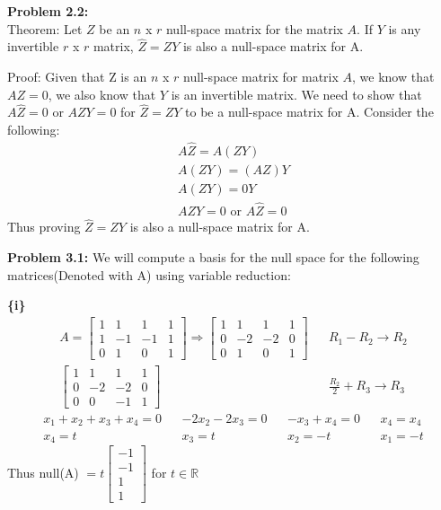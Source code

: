 \documentclass{article}
\begin{document}
 
\pagestyle{fancy}

\textbf{Problem 2.2:} \\
Theorem: Let $Z$ be an $n$ x $r$ null-space matrix for the matrix $A$. If $Y$ is any invertible $r$ x $r$ matrix,  $\hat{Z} = ZY$ is also a null-space matrix for A.

Proof: Given that Z is an $n$ x $r$ null-space matrix for matrix $A$, we know that $AZ = 0$, we also know that $Y$ is an invertible matrix. We need to show that $A\hat{Z} = 0$ or $AZY = 0$ for $\hat{Z} = ZY$ to be a null-space matrix for A. Consider the following:
\begin{align*}
    A \hat{Z} = A(ZY) \\
    A(ZY) = (AZ)Y \\
    A(ZY) = 0Y \\
    AZY = 0 \text{ or } A\hat{Z} = 0
\end{align*}
Thus proving $\hat{Z} = ZY$ is also a null-space matrix for A. \newline

\textbf{Problem 3.1:} We will compute a basis for the null space for the following matrices(Denoted with A) using variable reduction:

\textbf{\{i\}}
\begin{align*} A =
    \begin{bmatrix}
        1 & 1 & 1 & 1 \\
        1 & -1 & -1 & 1 \\
        0 & 1 & 0 & 1
    \end{bmatrix} \Rightarrow
    \begin{bmatrix}
        1 & 1 & 1 & 1 \\
        0 & -2 & -2 & 0 \\
        0 & 1 & 0 & 1
    \end{bmatrix} && R_1 - R_2 \xrightarrow{} R_2 \\
    \begin{bmatrix}
        1 & 1 & 1 & 1 \\
        0 & -2 & -2 & 0 \\
        0 & 0 & -1 & 1
    \end{bmatrix} && \frac{R_2}{2} + R_3 \xrightarrow{} R_3 
\end{align*}\begin{align*}
    x_1 + x_2 + x_3 + x_4 = 0 && -2x_2 - 2x_3 = 0 && -x_3 + x_4 = 0 && x_4 = x_4 \\
    x_4 = t && x_3 = t && x_2 = -t && x_1 = -t
\end{align*}
Thus null(A) $ = t\begin{bmatrix} -1 \\ -1 \\ 1 \\ 1\end{bmatrix}$ for $t \in \mathbb{R}$ \newline
\end{document}
